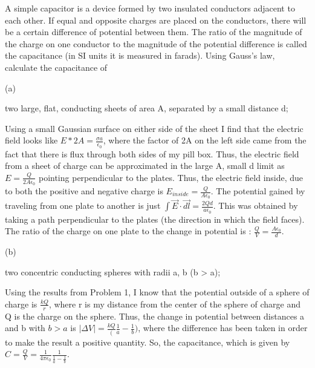 \begin{homeworkProblem}
A simple capacitor is a device formed by two insulated conductors adjacent to each 
other. If equal and opposite charges are placed on the conductors, there will be a 
certain difference of potential between them. The ratio of the magnitude of the 
charge on one conductor to the magnitude of the potential difference is called the 
capacitance (in SI units it is measured in farads). Using Gauss's law, calculate the 
capacitance of 

\begin{homeworkSection}{(a)}

two large, flat, conducting sheets of area A, separated by a small distance d; 

Using a small Gaussian surface on either side of the sheet I find that the electric field looks like $E * 2A = \frac{\sigma a}{\epsilon_0}$, where the factor of 2A on the left side came from the fact that there is flux through both sides of my pill box. Thus, the electric field from a sheet of charge can be approximated in the large A, small d limit as $E = \frac{Q}{2 A \epsilon_0}$ pointing perpendicular to the plates. Thus, the electric field inside, due to both the positive and negative charge is $E_{inside} = \frac{Q}{A \epsilon_0}$. The potential gained by traveling from one plate to another is just $\int \vec{E}\cdot \vec{dl} = \frac{2Q d}{a \epsilon_0}$. This was obtained by taking a path perpendicular to the plates (the direction in which the field faces). The ratio of the charge on one plate to the change in potential is : $\frac{Q}{V} = \frac{A \epsilon_0}{d}$.

\end{homeworkSection}

\begin{homeworkSection}{(b)}

two concentric conducting spheres with radii a, b (b > a); 

Using the results from Problem 1, I know that the potential outside of a sphere of charge is $\frac{k Q}{r}$, where r is my distance from the center of the sphere of charge and Q is the charge on the sphere. Thus, the change in potential between distances a and b with $ b > a $ is $|\Delta V| = \frac{k Q} (\frac{1}{a} - \frac{1}{b})$, where the difference has been taken in order to make the result a positive quantity. So, the capacitance, which is given by $ C = \frac{Q}{V} = \frac{1}{4\pi \epsilon_0}\frac{1}{\frac{1}{a}-\frac{1}{b}} $.

\end{homeworkSection}


\end{homeworkProblem}
